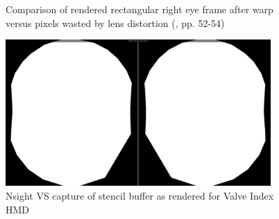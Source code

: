 \begin{figure}[h]
  \centering
  \hspace*{\fill}
  \hfill
  \hspace*{\fill}
     \caption{Comparison of rendered rectangular right eye frame after warp versus pixels wasted by lens distortion (\cite{Vlachos.2015}, pp. 52-54)}
     \label{fig:stencil_wastecomparison}
\end{figure}

\begin{figure}[htb]
  \centering
  \includegraphics[width=0.9\textwidth]{pictures/stencilmask_Index_crop}
  \caption{\gls{Nsight VS} capture of stencil buffer as rendered for Valve Index \gls{HMD}} \label{fig:stencil_index}
\end{figure}

